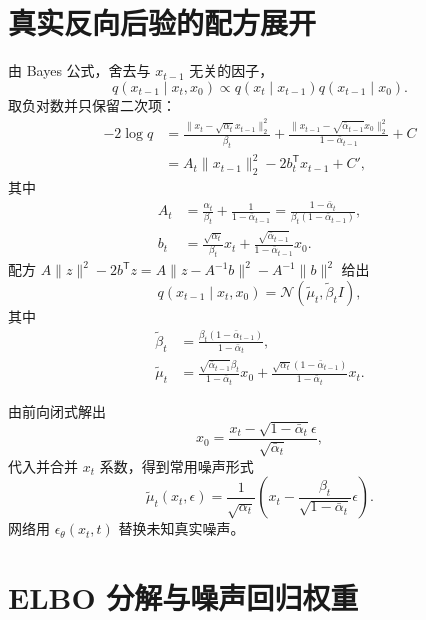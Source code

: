\documentclass[11pt]{article}
\numberwithin{equation}{section}
\newcommand{\1}{\mathbf{1}}
\newcommand{\T}{\mathsf{T}}
\newcommand{\cN}{\mathcal{N}}
\begin{document}
\section{真实反向后验的配方展开}

由 Bayes 公式，舍去与 $x_{t-1}$ 无关的因子，
\begin{equation}
 q(x_{t-1}\mid x_t,x_0)
 \propto q(x_t\mid x_{t-1})q(x_{t-1}\mid x_0).
\end{equation}
取负对数并只保留二次项：
\begin{align}
 -2\log q
 &=\frac{\|x_t-\sqrt{\alpha_t}x_{t-1}\|_2^2}{\beta_t}
 +\frac{\|x_{t-1}-\sqrt{\bar\alpha_{t-1}}x_0\|_2^2}
 {1-\bar\alpha_{t-1}}+C\\
 &=A_t\|x_{t-1}\|_2^2-2b_t^{\T}x_{t-1}+C',
\end{align}
其中
\begin{align}
 A_t&=\frac{\alpha_t}{\beta_t}
 +\frac1{1-\bar\alpha_{t-1}}
 =\frac{1-\bar\alpha_t}{\beta_t(1-\bar\alpha_{t-1})},\\
 b_t&=\frac{\sqrt{\alpha_t}}{\beta_t}x_t
 +\frac{\sqrt{\bar\alpha_{t-1}}}{1-\bar\alpha_{t-1}}x_0.
\end{align}
配方 $A\|z\|^2-2b^{\T}z=A\|z-A^{-1}b\|^2-A^{-1}\|b\|^2$ 给出
\begin{equation}
 q(x_{t-1}\mid x_t,x_0)=\cN(\widetilde\mu_t,\widetilde\beta_tI),
\end{equation}
其中
\begin{align}
 \widetilde\beta_t
 &=\frac{\beta_t(1-\bar\alpha_{t-1})}{1-\bar\alpha_t},\\
 \widetilde\mu_t
 &=\frac{\sqrt{\bar\alpha_{t-1}}\beta_t}{1-\bar\alpha_t}x_0
 +\frac{\sqrt{\alpha_t}(1-\bar\alpha_{t-1})}{1-\bar\alpha_t}x_t.
\end{align}

由前向闭式解出
\begin{equation}
 x_0=\frac{x_t-\sqrt{1-\bar\alpha_t}\epsilon}{\sqrt{\bar\alpha_t}},
\end{equation}
代入并合并 $x_t$ 系数，得到常用噪声形式
\begin{equation}
 \boxed{
 \widetilde\mu_t(x_t,\epsilon)
 =\frac1{\sqrt{\alpha_t}}
 \left(x_t-\frac{\beta_t}{\sqrt{1-\bar\alpha_t}}\epsilon\right).}
\end{equation}
网络用 $\epsilon_\theta(x_t,t)$ 替换未知真实噪声。

\section{ELBO 分解与噪声回归权重}
\end{document}
